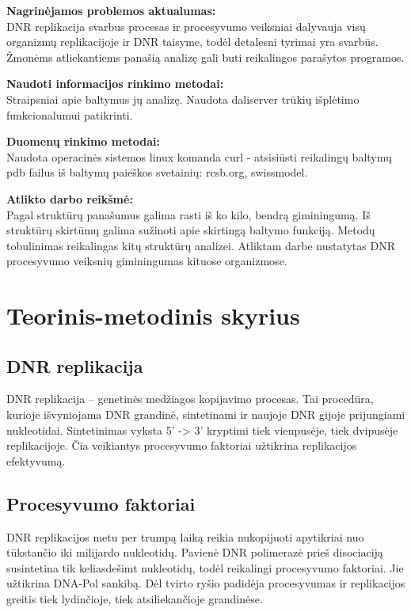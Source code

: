 \documentclass[a4paper,12pt]{article}
\begin{document}
\textbf{Nagrinėjamos problemos aktualumas:} \\
DNR replikacija svarbus procesas ir procesyvumo veiksniai dalyvauja visų organizmų replikacijoje ir DNR taisyme, todėl detalesni tyrimai yra svarbūs. Žmonėms atliekantiems panašią analizę gali buti reikalingos parašytos programos. \\
\hfill

\textbf{Naudoti informacijos rinkimo metodai:} \\
Straipsniai apie baltymus jų analizę. Naudota daliserver trūkių išplėtimo funkcionalumui patikrinti. \\
\hfill

\textbf{Duomenų rinkimo  metodai:} \\
Naudota operacinės sistemos linux komanda curl - atsisiūsti reikalingų baltymų pdb failus iš baltymų paieškos svetainių: rcsb.org, swissmodel.  \\
\hfill


\textbf{Atlikto darbo reikšmė:} \\
Pagal struktūrų panašumus galima rasti iš ko kilo, bendrą giminingumą. Iš struktūrų skirtūmų galima sužinoti apie skirtingą baltymo funkciją. Metodų tobulinimas reikalingas kitų struktūrų analizei.
Atliktam darbe nustatytas DNR procesyvumo veiksnių giminingumas kituose organizmose. 


\clearpage 

\section{Teorinis-metodinis skyrius}

\subsection{DNR replikacija}
\qquad DNR replikacija – genetinės medžiagos kopijavimo procesas. Tai procedūra, kurioje išvyniojama DNR grandinė, sintetinami ir naujoje DNR gijoje prijungiami nukleotidai. Sintetinimas vyksta 5' -> 3' kryptimi tiek vienpusėje, tiek dvipusėje replikacijoje. Čia veikiantys procesyvumo faktoriai užtikrina replikacijos efektyvumą.
\smallskip

\subsection{Procesyvumo faktoriai}

\qquad DNR replikacijos metu per trumpą laiką reikia nukopijuoti apytikriai nuo tūkstančio iki milijardo nukleotidų. Pavienė DNR polimerazė prieš disociaciją susintetina tik keliasdešimt nukleotidų, todėl reikalingi procesyvumo faktoriai.  Jie  užtikrina DNA-Pol sankibą. Dėl tvirto ryšio padidėja procesyvumas ir replikacijos greitis tiek lydinčioje, tiek atsiliekančioje grandinėse.
 
\end{document}

